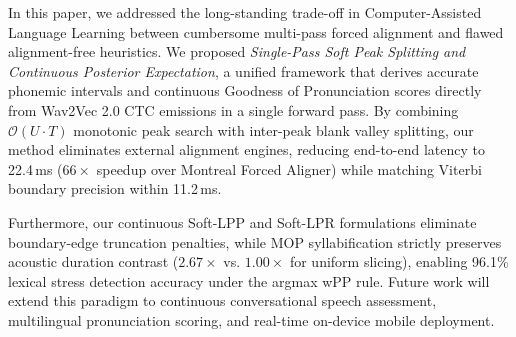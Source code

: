 \documentclass[10pt,conference]{IEEEtran}
\begin{document}
In this paper, we addressed the long-standing trade-off in Computer-Assisted Language Learning between cumbersome multi-pass forced alignment and flawed alignment-free heuristics. We proposed \textit{Single-Pass Soft Peak Splitting and Continuous Posterior Expectation}, a unified framework that derives accurate phonemic intervals and continuous Goodness of Pronunciation scores directly from Wav2Vec 2.0 CTC emissions in a single forward pass. By combining $\mathcal{O}(U \cdot T)$ monotonic peak search with inter-peak blank valley splitting, our method eliminates external alignment engines, reducing end-to-end latency to 22.4\,ms ($66\times$ speedup over Montreal Forced Aligner) while matching Viterbi boundary precision within 11.2\,ms. 

Furthermore, our continuous Soft-LPP and Soft-LPR formulations eliminate boundary-edge truncation penalties, while MOP syllabification strictly preserves acoustic duration contrast ($2.67\times$ vs. $1.00\times$ for uniform slicing), enabling 96.1\% lexical stress detection accuracy under the argmax wPP rule. Future work will extend this paradigm to continuous conversational speech assessment, multilingual pronunciation scoring, and real-time on-device mobile deployment.



\end{document}
